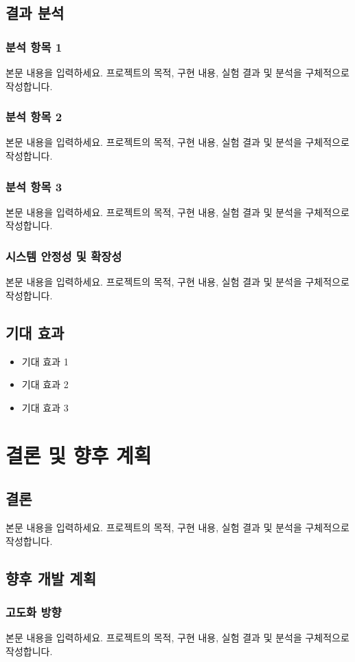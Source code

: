 \documentclass[12pt,a4paper,oneside]{report}
\newcommand{\placeholdertext}{%
  본문 내용을 입력하세요. 프로젝트의 목적, 구현 내용, 실험 결과 및 분석을 구체적으로 작성합니다.
}
\begin{document}
\section{결과 분석}

\subsection{분석 항목 1}
\placeholdertext

\subsection{분석 항목 2}
\placeholdertext

\subsection{분석 항목 3}
\placeholdertext

\subsection{시스템 안정성 및 확장성}
\placeholdertext

\section{기대 효과}
\begin{itemize}[leftmargin=1.5em,label={-},itemsep=2pt,topsep=4pt]
  \item 기대 효과 1
  \item 기대 효과 2
  \item 기대 효과 3
\end{itemize}

\chapter{결론 및 향후 계획}

\section{결론}
\placeholdertext

\section{향후 개발 계획}

\subsection{고도화 방향}
\placeholdertext
\end{document}
